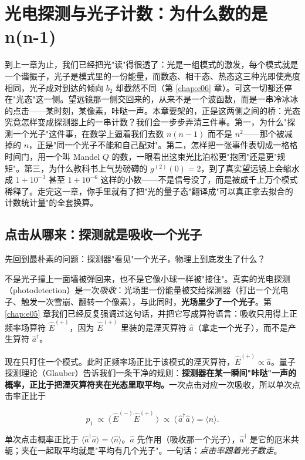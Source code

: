 \chapter{光电探测与光子计数：为什么数的是 n(n-1)}
\label{chap:e07}

\begin{chapteropening}
到上一章为止，我们已经把光"读"得很透了：光是一组模式的激发，每个模式就是一个谐振子，光子是模式里的一份能量，而数态、相干态、热态这三种光即使亮度相同，光子成对到达的倾向 \(b_2\) 却截然不同（第 \ref{chap:e06} 章）。可这一切都还停在"光态"这一侧。望远镜那一侧交回来的，从来不是一个波函数，而是一串冷冰冰的点击——某时刻，某像素，咔哒一声。本章要架的，正是这两侧之间的桥：光态究竟怎样变成探测器上的一串计数？我们会一步步弄清三件事。第一，为什么"探测一个光子"这件事，在数学上逼着我们去数 \(n(n-1)\) 而不是 \(n^2\)——那个被减掉的 \(n\)，正是"同一个光子不能和自己配对"。第二，怎样把一张事件表切成一格格时间门，用一个叫 Mandel \(Q\) 的数，一眼看出这束光比泊松更"抱团"还是更"规矩"。第三，为什么教科书上气势磅礴的 \(g^{(2)}(0)=2\)，到了真实望远镜上会缩水成 \(1+10^{-3}\) 甚至 \(1+10^{-6}\) 这样的小数——不是信号没了，而是被成千上万个模式稀释了。走完这一章，你手里就有了把"光的量子态"翻译成"可以真正拿去拟合的计数统计量"的全套换算。
\end{chapteropening}

\section{点击从哪来：探测就是吸收一个光子}
\label{sec:e07-absorption}

先回到最朴素的问题：探测器"看见"一个光子，物理上到底发生了什么？

不是光子撞上一面墙被弹回来，也不是它像小球一样被"接住"。真实的光电探测（photodetection）是一次\emph{吸收}：光场里一份能量被交给探测器（打出一个光电子、触发一次雪崩、翻转一个像素），与此同时，\textbf{光场里少了一个光子}。第 \ref{chap:e05} 章我们已经反复强调过这句话，并把它写成算符语言：吸收只用得上正频率场算符 \(\hat E^{(+)}\)，因为 \(\hat E^{(+)}\) 里装的是湮灭算符 \(\hat a\)（拿走一个光子），而不是产生算符 \(\hat a^\dagger\)。

现在只盯住一个模式。此时正频率场正比于该模式的湮灭算符，\(\hat E^{(+)}\propto\hat a\)。量子探测理论（Glauber）告诉我们一条干净的规则：\textbf{探测器在某一瞬间"咔哒"一声的概率，正比于把湮灭算符夹在光态里取平均。}一次点击对应一次吸收，所以单次点击率正比于

\begin{equation}
  p_1\ \propto\ \big\langle\,\hat E^{(-)}\hat E^{(+)}\,\big\rangle
  \ \propto\ \big\langle\,\hat a^\dagger\hat a\,\big\rangle
  =\langle\hat n\rangle .
  \label{eq:e07-single-click}
\end{equation}
\begin{formulaexplain}
单次点击概率正比于 \(\langle\hat a^\dagger\hat a\rangle=\langle\hat n\rangle\)。\(\hat a\) 先作用（吸收那一个光子），\(\hat a^\dagger\) 是它的厄米共轭；夹在一起取平均就是"平均有几个光子"。一句话：\emph{点击率跟着光子数走}。
\end{formulaexplain}

